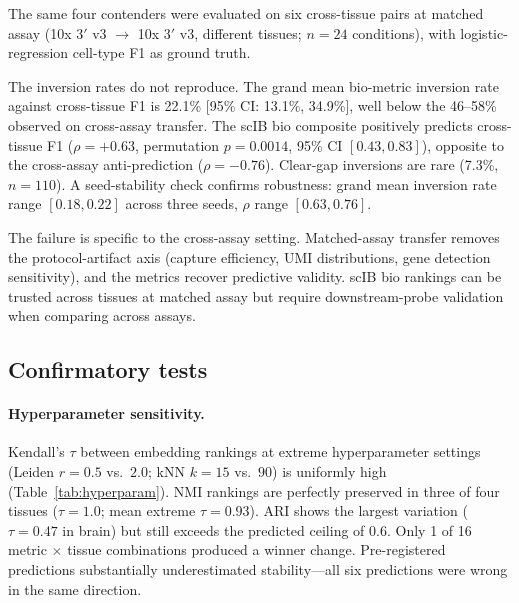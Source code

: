 \documentclass[11pt]{article}
\begin{document}
The same four contenders were evaluated on six cross-tissue pairs at matched assay (10x 3$'$ v3 $\rightarrow$ 10x 3$'$ v3, different tissues; $n = 24$ conditions), with logistic-regression cell-type F1 as ground truth.

The inversion rates do not reproduce. The grand mean bio-metric inversion rate against cross-tissue F1 is 22.1\% [95\% CI: 13.1\%, 34.9\%], well below the 46--58\% observed on cross-assay transfer. The scIB bio composite positively predicts cross-tissue F1 ($\rho = +0.63$, permutation $p = 0.0014$, 95\% CI $[0.43, 0.83]$), opposite to the cross-assay anti-prediction ($\rho = -0.76$). Clear-gap inversions are rare (7.3\%, $n = 110$). A seed-stability check confirms robustness: grand mean inversion rate range $[0.18, 0.22]$ across three seeds, $\rho$ range $[0.63, 0.76]$.

The failure is specific to the cross-assay setting. Matched-assay transfer removes the protocol-artifact axis (capture efficiency, UMI distributions, gene detection sensitivity), and the metrics recover predictive validity. scIB bio rankings can be trusted across tissues at matched assay but require downstream-probe validation when comparing across assays.


\subsection{Confirmatory tests}
\label{sec:confirmatory}

\paragraph{Hyperparameter sensitivity.} Kendall's $\tau$ between embedding rankings at extreme hyperparameter settings (Leiden $r = 0.5$ vs.\ $2.0$; kNN $k = 15$ vs.\ $90$) is uniformly high (Table~\ref{tab:hyperparam}). NMI rankings are perfectly preserved in three of four tissues ($\tau = 1.0$; mean extreme $\tau = 0.93$). ARI shows the largest variation ($\tau = 0.47$ in brain) but still exceeds the predicted ceiling of $0.6$. Only 1 of 16 metric $\times$ tissue combinations produced a winner change. Pre-registered predictions substantially underestimated stability---all six predictions were wrong in the same direction.
\end{document}
